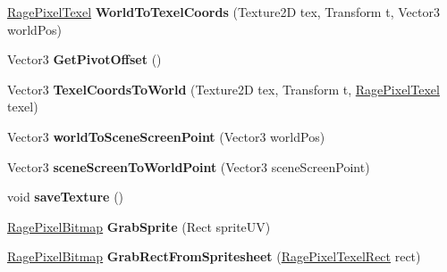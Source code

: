 \begin{DoxyCompactItemize}
\item 
\hypertarget{class_rage_pixel_sprite_editor_a817f7ee826ab5510a5c045a9361f4104}{\hyperlink{class_rage_pixel_texel}{Rage\-Pixel\-Texel} {\bfseries World\-To\-Texel\-Coords} (Texture2\-D tex, Transform t, Vector3 world\-Pos)}\label{class_rage_pixel_sprite_editor_a817f7ee826ab5510a5c045a9361f4104}

\item 
\hypertarget{class_rage_pixel_sprite_editor_a0532309139a8f9f7c4c5b6e71062c3d3}{Vector3 {\bfseries Get\-Pivot\-Offset} ()}\label{class_rage_pixel_sprite_editor_a0532309139a8f9f7c4c5b6e71062c3d3}

\item 
\hypertarget{class_rage_pixel_sprite_editor_ac8c634d551c16e7ca5c561b79e7bcfbf}{Vector3 {\bfseries Texel\-Coords\-To\-World} (Texture2\-D tex, Transform t, \hyperlink{class_rage_pixel_texel}{Rage\-Pixel\-Texel} texel)}\label{class_rage_pixel_sprite_editor_ac8c634d551c16e7ca5c561b79e7bcfbf}

\item 
\hypertarget{class_rage_pixel_sprite_editor_ac8178fe128b2c547d150dc9ee9644459}{Vector3 {\bfseries world\-To\-Scene\-Screen\-Point} (Vector3 world\-Pos)}\label{class_rage_pixel_sprite_editor_ac8178fe128b2c547d150dc9ee9644459}

\item 
\hypertarget{class_rage_pixel_sprite_editor_a2ed39c97d527f8d25909bdbaf99321e8}{Vector3 {\bfseries scene\-Screen\-To\-World\-Point} (Vector3 scene\-Screen\-Point)}\label{class_rage_pixel_sprite_editor_a2ed39c97d527f8d25909bdbaf99321e8}

\item 
\hypertarget{class_rage_pixel_sprite_editor_a95997ede63bd3c96b68026269dab5f66}{void {\bfseries save\-Texture} ()}\label{class_rage_pixel_sprite_editor_a95997ede63bd3c96b68026269dab5f66}

\item 
\hypertarget{class_rage_pixel_sprite_editor_a0be8ecb3a13b6b780a202be089ccd1f8}{\hyperlink{class_rage_pixel_bitmap}{Rage\-Pixel\-Bitmap} {\bfseries Grab\-Sprite} (Rect sprite\-U\-V)}\label{class_rage_pixel_sprite_editor_a0be8ecb3a13b6b780a202be089ccd1f8}

\item 
\hypertarget{class_rage_pixel_sprite_editor_a410c24a826310dff5a0a09a05064d96e}{\hyperlink{class_rage_pixel_bitmap}{Rage\-Pixel\-Bitmap} {\bfseries Grab\-Rect\-From\-Spritesheet} (\hyperlink{class_rage_pixel_texel_rect}{Rage\-Pixel\-Texel\-Rect} rect)}\label{class_rage_pixel_sprite_editor_a410c24a826310dff5a0a09a05064d96e}


\end{DoxyCompactItemize}
